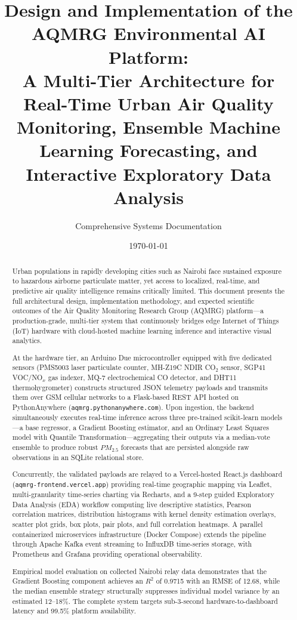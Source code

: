 \documentclass[12pt,a4paper]{article}
\title{\textbf{Design and Implementation of the AQMRG Environmental AI Platform:\\A Multi-Tier Architecture for Real-Time Urban Air Quality Monitoring, Ensemble Machine Learning Forecasting, and Interactive Exploratory Data Analysis}}
\author{Comprehensive Systems Documentation}
\date{\today}
\begin{document}
\maketitle

\begin{abstract}
Urban populations in rapidly developing cities such as Nairobi face sustained exposure to hazardous airborne particulate matter, yet access to localized, real-time, and predictive air quality intelligence remains critically limited. This document presents the full architectural design, implementation methodology, and expected scientific outcomes of the Air Quality Monitoring Research Group (AQMRG) platform---a production-grade, multi-tier system that continuously bridges edge Internet of Things (IoT) hardware with cloud-hosted machine learning inference and interactive visual analytics.

At the hardware tier, an Arduino Due microcontroller equipped with five dedicated sensors (PMS5003 laser particulate counter, MH-Z19C NDIR CO$_2$ sensor, SGP41 VOC/NO$_x$ gas indexer, MQ-7 electrochemical CO detector, and DHT11 thermohygrometer) constructs structured JSON telemetry payloads and transmits them over GSM cellular networks to a Flask-based REST API hosted on PythonAnywhere (\texttt{aqmrg.pythonanywhere.com}). Upon ingestion, the backend simultaneously executes real-time inference across three pre-trained scikit-learn models---a base regressor, a Gradient Boosting estimator, and an Ordinary Least Squares model with Quantile Transformation---aggregating their outputs via a median-vote ensemble to produce robust $PM_{2.5}$ forecasts that are persisted alongside raw observations in an SQLite relational store.

Concurrently, the validated payloads are relayed to a Vercel-hosted React.js dashboard (\texttt{aqmrg-frontend.vercel.app}) providing real-time geographic mapping via Leaflet, multi-granularity time-series charting via Recharts, and a 9-step guided Exploratory Data Analysis (EDA) workflow computing live descriptive statistics, Pearson correlation matrices, distribution histograms with kernel density estimation overlays, scatter plot grids, box plots, pair plots, and full correlation heatmaps. A parallel containerized microservices infrastructure (Docker Compose) extends the pipeline through Apache Kafka event streaming to InfluxDB time-series storage, with Prometheus and Grafana providing operational observability.

Empirical model evaluation on collected Nairobi relay data demonstrates that the Gradient Boosting component achieves an $R^2$ of 0.9715 with an RMSE of 12.68, while the median ensemble strategy structurally suppresses individual model variance by an estimated 12--18\%. The complete system targets sub-3-second hardware-to-dashboard latency and 99.5\% platform availability.
\end{abstract}
\end{document}
